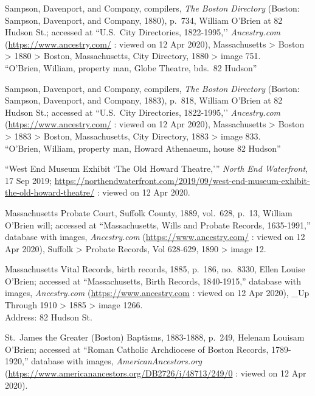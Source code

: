 \begin{thebibliography}{999}
	Sampson, Davenport, and Company, compilers, \textit{The Boston Directory} (Boston: Sampson, Davenport, and Company, 1880), p.\ 734, William O'Brien at 82 Hudson St.; accessed at ``U.S.\ City Directories, 1822-1995,’’ \textit{Ancestry.com} (\url{https://www.ancestry.com/} : viewed on 12 Apr 2020), Massachusetts > Boston > 1880 > Boston, Massachusetts, City Directory, 1880 > image 751.\\
	``O'Brien, William, property man, Globe Theatre, bds.\ 82 Hudson''
	
	Sampson, Davenport, and Company, compilers, \textit{The Boston Directory} (Boston: Sampson, Davenport, and Company, 1883), p.\ 818, William O'Brien at 82 Hudson St.; accessed at ``U.S.\ City Directories, 1822-1995,’’ \textit{Ancestry.com} (\url{https://www.ancestry.com/} : viewed on 12 Apr 2020), Massachusetts > Boston > 1883 > Boston, Massachusetts, City Directory, 1883 > image 833.\\
	``O'Brien, William, property man, Howard Athenaeum, house 82 Hudson''
	
	``West End Museum Exhibit `The Old Howard Theatre,''' \textit{North End Waterfront}, 17 Sep 2019;  \url{https://northendwaterfront.com/2019/09/west-end-museum-exhibit-the-old-howard-theatre/} : viewed on 12 Apr 2020.
	
	Massachusetts Probate Court, Suffolk County, 1889, vol.\ 628, p.\ 13, William O'Brien will; accessed at ``Massachusetts, Wills and Probate Records, 1635-1991,'' database with images, \textit{Ancestry.com} (\url{https://www.ancestry.com/} : viewed on 12 Apr 2020), Suffolk > Probate Records, Vol 628-629, 1890 > image 12.
	
	Massachusetts Vital Records, birth records, 1885, p.\ 186, no.\ 8330, Ellen Louise O'Brien; accessed at ``Massachusetts, Birth Records, 1840-1915,'' database with images, \textit{Ancestry.com} (\url{https://www.ancestry.com} : viewed on 12 Apr 2020), \_Up Through 1910 > 1885 > image 1266.\\
	Address: 82 Hudson St.
	
	St.\ James the Greater (Boston) Baptisms, 1883-1888, p.\ 249, Helenam Louisam O'Brien; accessed at ``Roman Catholic Archdiocese of Boston Records, 1789-1920,'' database with images, \textit{AmericanAncestors.org} (\url{https://www.americanancestors.org/DB2726/i/48713/249/0} : viewed on 12 Apr 2020).
	

\end{thebibliography}
